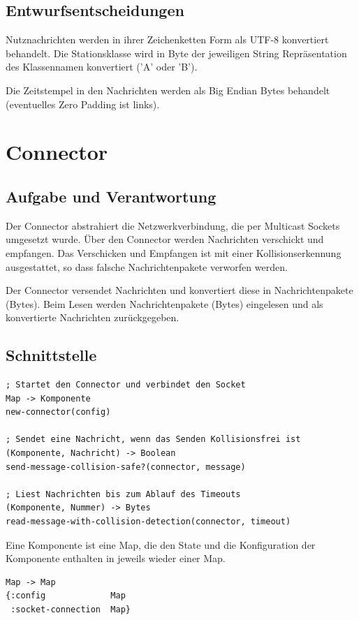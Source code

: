 \documentclass[draft=false
              ,paper=a4
              ,twoside=false
              ,fontsize=11pt
              ,headsepline
              ,BCOR10mm
              ,DIV11
              ]{scrbook}
\begin{document}
\subsection{Entwurfsentscheidungen}
Nutznachrichten werden in ihrer Zeichenketten Form als UTF-8 konvertiert behandelt. Die Stationsklasse wird in Byte der jeweiligen String Repräsentation des Klassennamen konvertiert ('A' oder 'B').

Die Zeitstempel in den Nachrichten werden als Big Endian Bytes behandelt (eventuelles Zero Padding ist links).

\section{Connector}
\subsection{Aufgabe und Verantwortung}
Der Connector abstrahiert die Netzwerkverbindung, die per Multicast Sockets umgesetzt wurde. Über den Connector werden Nachrichten verschickt und empfangen. Das Verschicken und Empfangen ist mit einer Kollisionserkennung ausgestattet, so dass falsche Nachrichtenpakete verworfen werden.

Der Connector versendet Nachrichten und konvertiert diese in Nachrichtenpakete (Bytes). Beim Lesen werden Nachrichtenpakete (Bytes) eingelesen und als konvertierte Nachrichten zurückgegeben.

\subsection{Schnittstelle}
\begin{lstlisting}
; Startet den Connector und verbindet den Socket
Map -> Komponente
new-connector(config)

; Sendet eine Nachricht, wenn das Senden Kollisionsfrei ist
(Komponente, Nachricht) -> Boolean
send-message-collision-safe?(connector, message)

; Liest Nachrichten bis zum Ablauf des Timeouts
(Komponente, Nummer) -> Bytes
read-message-with-collision-detection(connector, timeout) 
\end{lstlisting}

Eine Komponente ist eine Map, die den State und die Konfiguration der Komponente enthalten in jeweils wieder einer Map.
\begin{lstlisting}
Map -> Map
{:config             Map
 :socket-connection  Map}
\end{lstlisting}
\end{document}
